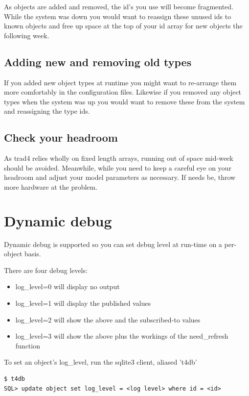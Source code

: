 \documentclass{report}
\begin{document}
As objects are added and removed, the id's you use will become fragmented. While the system was down you would want to reassign these unused ids to known objects and free up space at the top of your id array for new objects the following week.

\subsection{Adding new and removing old types}

If you added new object types at runtime you might want to re-arrange them more comfortably in the configuration files. Likewise if you removed any object types when the system was up you would want to remove these from the system and reassigning the type ids.

\subsection{Check your headroom}

As trad4 relies wholly on fixed length arrays, running out of space mid-week should be avoided.  Meanwhile, while you need to keep a careful eye on your headroom and adjust your model parameters as necessary. If needs be, throw more hardware at the problem.

\section{Dynamic debug}

Dynamic debug is supported so you can set debug level at run-time on a per-object basis. 

There are four debug levels:

\begin{itemize}
\item log_level=0 will display no output
\item log_level=1 will display the published values
\item log_level=2 will show the above and the subscribed-to values
\item log_level=3 will show the above plus the workings of the need_refresh function
\end{itemize}

To set an object's log_level, run the sqlite3 client, aliased 't4db'

\begin{verbatim}
$ t4db
SQL> update object set log_level = <log level> where id = <id>
\end{verbatim}
\end{document}

